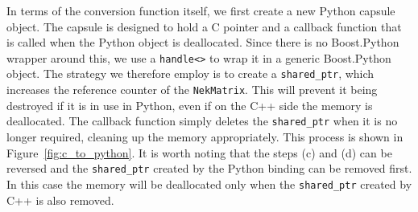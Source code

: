 In terms of the conversion function itself, we first create a new Python capsule
object. The capsule is designed to hold a C pointer and a callback function that
is called when the Python object is deallocated. Since there is no Boost.Python
wrapper around this, we use a \texttt{handle<>} to wrap it in a generic
Boost.Python object. The strategy we therefore employ is to create a
\texttt{shared\_ptr}, which increases the reference counter of the
\texttt{NekMatrix}. This will prevent it being destroyed if it is in use in
Python, even if on the C++ side the memory is deallocated. The callback function
simply deletes the \texttt{shared\_ptr} when it is no longer required, cleaning
up the memory appropriately. This process is shown in
Figure~\ref{fig:c_to_python}. It is worth noting that the steps (c) and (d) can
be reversed and the \texttt{shared\_ptr} created by the Python binding can be
removed first.  In this case the memory will be deallocated only when the
\texttt{shared\_ptr} created by C++ is also removed.

